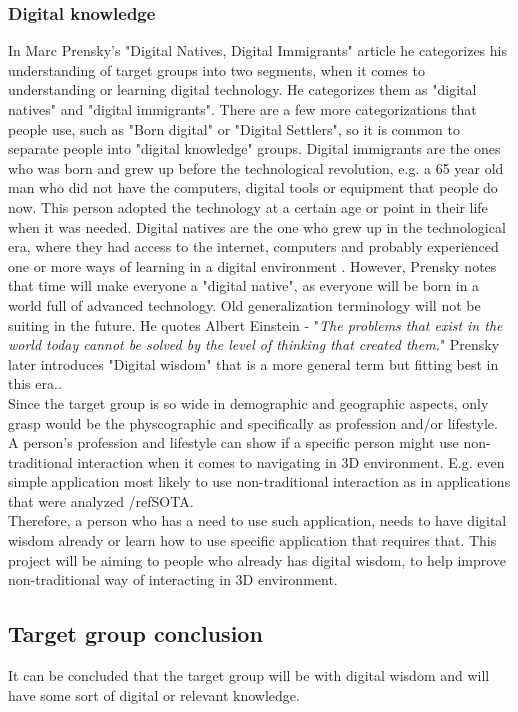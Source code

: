 \subsubsection{Digital knowledge}
In Marc Prensky's "Digital Natives, Digital Immigrants" \cite{DigitalImmigrants} article he categorizes his understanding of target groups into two segments, when it comes to understanding or learning digital technology. He categorizes them as "digital natives" and "digital immigrants". There are a few more categorizations that people use, such as "Born digital" or "Digital Settlers", so it is common to separate people into "digital knowledge" groups.
Digital immigrants are the ones who was born and grew up before the technological revolution, e.g. a 65 year old man who did not have the computers, digital tools or equipment that people do now. This person adopted the technology at a certain age or point in their life when it was needed. 
Digital natives are the one who grew up in the technological era, where they had access to the internet, computers and probably experienced one or more ways of learning in a digital environment \cite{DigitalImmigrants}. However, Prensky notes that time will make everyone a "digital native", as everyone will be born in a world full of advanced technology. Old generalization terminology will not be suiting in the future. He quotes Albert Einstein - "\textit{The problems that exist in the world today cannot be solved by the level of thinking that created them.}" Prensky later introduces "Digital wisdom" that is a more general term but fitting best in this era.\cite{DigitaIWisdom}. 
\\
Since the target group is so wide in demographic and geographic aspects, only grasp would be the physcographic and specifically as profession and/or lifestyle. A person's profession and lifestyle can show if a specific person might use non-traditional interaction when it comes to navigating in 3D environment. E.g. even simple application most likely to use non-traditional interaction as in applications that were analyzed /ref{SOTA}.
\\
Therefore, a person who has a need to use such application, needs to have digital wisdom already or learn how to use specific application that requires that. This project will be aiming to people who already has digital wisdom, to help improve non-traditional way of interacting in 3D environment.
\\
\subsection{Target group conclusion}
It can be concluded that the target group will be with digital wisdom and will have some sort of digital or relevant knowledge. 